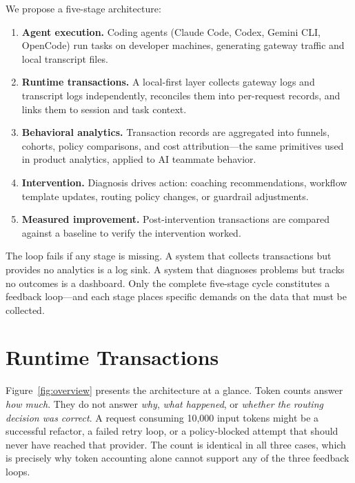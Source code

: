 \documentclass[sigconf,anonymous,review]{acmart}
\begin{document}
We propose a five-stage architecture:

\begin{enumerate}
  \item \textbf{Agent execution.} Coding agents (Claude Code, Codex,
    Gemini CLI, OpenCode) run tasks on developer machines, generating
    gateway traffic and local transcript files.
  \item \textbf{Runtime transactions.} A local-first layer collects
    gateway logs and transcript logs independently, reconciles them
    into per-request records, and links them to session and task
    context.
  \item \textbf{Behavioral analytics.} Transaction records are
    aggregated into funnels, cohorts, policy comparisons, and cost
    attribution---the same primitives used in product analytics,
    applied to AI teammate behavior.
  \item \textbf{Intervention.} Diagnosis drives action: coaching
    recommendations, workflow template updates, routing policy
    changes, or guardrail adjustments.
  \item \textbf{Measured improvement.} Post-intervention transactions
    are compared against a baseline to verify the intervention worked.
\end{enumerate}

The loop fails if any stage is missing. A system that collects
transactions but provides no analytics is a log sink. A system that
diagnoses problems but tracks no outcomes is a dashboard. Only the
complete five-stage cycle constitutes a feedback loop---and each
stage places specific demands on the data that must be collected.

\section{Runtime Transactions}
\label{sec:transactions}

Figure~\ref{fig:overview} presents the architecture at a glance.
Token counts answer \emph{how much}. They do not answer \emph{why},
\emph{what happened}, or \emph{whether the routing decision was
correct}. A request consuming 10,000 input tokens might be a
successful refactor, a failed retry loop, or a policy-blocked
attempt that should never have reached that provider. The count is
identical in all three cases, which is precisely why token
accounting alone cannot support any of the three feedback loops.
\end{document}
